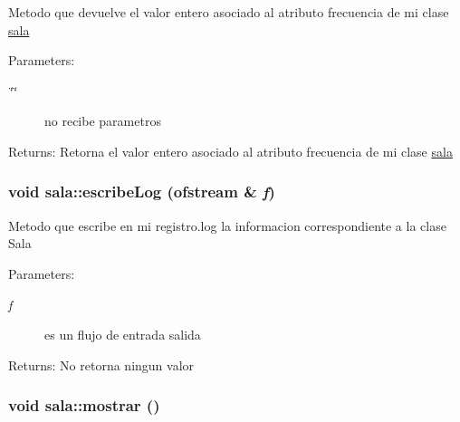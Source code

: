 Metodo que devuelve el valor entero asociado al atributo frecuencia de mi clase \hyperlink{classsala}{sala} \begin{Desc}
\item[Parameters:]
\begin{description}
\item[{\em \char`\"{}\char`\"{}}]no recibe parametros \end{description}
\end{Desc}
\begin{Desc}
\item[Returns:]Retorna el valor entero asociado al atributo frecuencia de mi clase \hyperlink{classsala}{sala} \end{Desc}
\hypertarget{classsala_68552d6940a68c2a4cd4351f38acf546}{
\subsubsection[escribeLog]{\setlength{\rightskip}{0pt plus 5cm}void sala::escribeLog (ofstream \& {\em f})}}
\label{classsala_68552d6940a68c2a4cd4351f38acf546}


Metodo que escribe en mi registro.log la informacion correspondiente a la clase Sala \begin{Desc}
\item[Parameters:]
\begin{description}
\item[{\em f}]es un flujo de entrada salida \end{description}
\end{Desc}
\begin{Desc}
\item[Returns:]No retorna ningun valor \end{Desc}
\hypertarget{classsala_468ec985fcba82e578dd81de0102dede}{
\subsubsection[mostrar]{\setlength{\rightskip}{0pt plus 5cm}void sala::mostrar ()}}
\label{classsala_468ec985fcba82e578dd81de0102dede}


